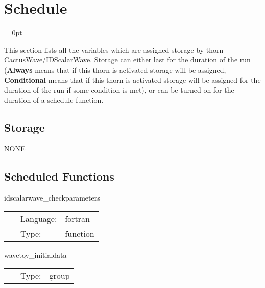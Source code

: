
\section{Schedule} 


\parskip = 0pt


\noindent This section lists all the variables which are assigned storage by thorn CactusWave/IDScalarWave.  Storage can either last for the duration of the run ({\bf Always} means that if this thorn is activated storage will be assigned, {\bf Conditional} means that if this thorn is activated storage will be assigned for the duration of the run if some condition is met), or can be turned on for the duration of a schedule function.


\subsection*{Storage}NONE
\subsection*{Scheduled Functions}
\vspace{5mm}


\hspace{5mm} idscalarwave\_checkparameters 

\hspace{5mm}{\it check parameters } 


\hspace{5mm}

 \begin{tabular*}{160mm}{cll} 
~ & Language:  & fortran \\ 
~ & Type:  & function \\ 
\end{tabular*} 


\vspace{5mm}


\hspace{5mm} wavetoy\_initialdata 

\hspace{5mm}{\it execute initial data for wavetoy } 


\hspace{5mm}

 \begin{tabular*}{160mm}{cll} 
~ & Type:  & group \\ 
\end{tabular*} 


